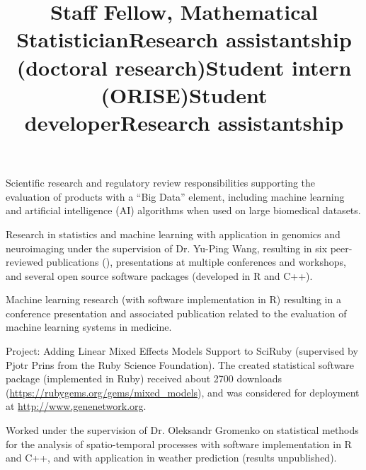 \documentclass[overlapped, line, 10pt]{res} %
\begin{document}
\begin{resume}
\title{Staff Fellow, Mathematical Statistician}
\begin{position}
  Scientific research and regulatory review responsibilities supporting the evaluation of products with a ``Big Data'' element, including machine learning and artificial intelligence (AI) algorithms when used on large biomedical datasets.
\end{position}

\title{Research assistantship (doctoral research)}
\begin{position}
  Research in statistics and machine learning with application in genomics and neuroimaging under the supervision of Dr. Yu-Ping Wang, resulting in six peer-reviewed publications (\cite{gossmann2015, cao2015BCB, cao2015bioinformatics, Gossmann2017-yu, Gossmann2017-ln, brzyski2016}), presentations at multiple conferences and workshops, and several open source software packages (developed in R and C++).
\end{position}

\title{Student intern (ORISE)}
\begin{position}
  Machine learning research (with software implementation in R) resulting in a conference presentation and associated publication \cite{gossmann2018} related to the evaluation of machine learning systems in medicine.
\end{position}

\title{Student developer}
\begin{position}
  Project: Adding Linear Mixed Effects Models Support to SciRuby (supervised by Pjotr Prins from the Ruby Science Foundation). The created statistical software package (implemented in Ruby) received about 2700 downloads (\url{https://rubygems.org/gems/mixed_models}), and was considered for deployment at \url{http://www.genenetwork.org}.
\end{position}

\title{Research assistantship}
\begin{position}
  Worked under the supervision of Dr. Oleksandr Gromenko on statistical methods for the analysis of spatio-temporal processes with software implementation in R and C++, and with application in weather prediction (results unpublished).
\end{position}


\end{resume}
\end{document}
